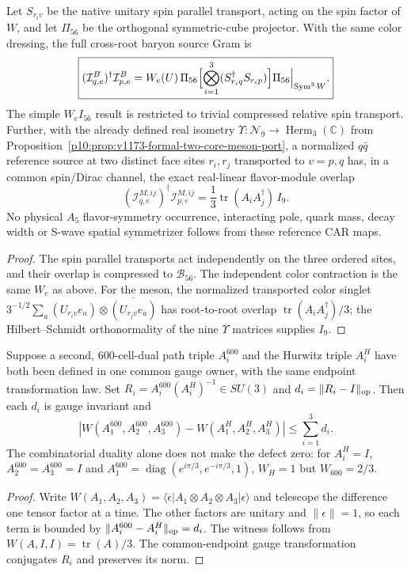 \documentclass[12pt,a4paper]{article}
\begin{document}
\begin{proposition}
\label{p10:prop:v3023-spin-meson-source-overlap}
Let $S_{r_iv}$ be the native unitary spin parallel transport, acting
on the spin factor of $W$, and let $\Pi_{56}$ be the orthogonal
symmetric-cube projector. With the same color dressing, the full
cross-root baryon source Gram is
\[
\boxed{(\mathcal I_{q,e}^B)^\dagger\mathcal I_{p,e}^B
 =W_e(U)\,\Pi_{56}\Bigl[\bigotimes_{i=1}^3
 (S_{r_iq}^\dagger S_{r_ip})\Bigr]\Pi_{56}
 \Big|_{\operatorname{Sym}^3W}.}
\]
The simple $W_eI_{56}$ result is restricted to trivial compressed
relative spin transport. Further, with the already defined real
isometry $\Upsilon:\mathcal N_9\to\operatorname{Herm}_3(\mathbb C)$
from Proposition~\ref{p10:prop:v1173-formal-two-core-meson-port},
a normalized $q\bar q$ reference source at two distinct face sites
$r_i,r_j$ transported to $v=p,q$ has, in a common spin/Dirac
channel, the exact real-linear flavor-module overlap
\[
\boxed{(\mathcal I_{q,e}^{M,ij})^\dagger
 \mathcal I_{p,e}^{M,ij}
 =\frac13\operatorname{tr}(A_iA_j^\dagger)\,I_9.}
\]
No physical $A_5$ flavor-symmetry occurrence, interacting pole,
quark mass, decay width or S-wave spatial symmetrizer follows from
these reference CAR maps.
\end{proposition}
\begin{proof}
The spin parallel transports act independently on the three
ordered sites, and their overlap is compressed to $\mathcal B_{56}$.
The independent color contraction is the same $W_e$ as above.
For the meson, the normalized transported color singlet
$3^{-1/2}\sum_a(U_{r_iv}e_a)\otimes
\overline{(U_{r_jv}e_a)}$ has root-to-root overlap
$\operatorname{tr}(A_iA_j^\dagger)/3$; the Hilbert--Schmidt
orthonormality of the nine $\Upsilon$ matrices supplies $I_9$.
\end{proof}

\begin{proposition}
\label{p10:prop:v3023-two-presentation-holonomy-defect}
Suppose a second, 600-cell-dual path triple $A_i^{600}$ and the
Hurwitz triple $A_i^H$ have both been defined in one common gauge
owner, with the same endpoint transformation law. Set
$R_i=A_i^{600}(A_i^H)^{-1}\in SU(3)$ and
$d_i=\|R_i-I\|_{\rm op}$. Then each $d_i$ is gauge invariant and
\[
\boxed{|W(A_1^{600},A_2^{600},A_3^{600})
 -W(A_1^H,A_2^H,A_3^H)|\le\sum_{i=1}^3d_i.}
\]
The combinatorial duality alone does not make the defect zero:
for $A_i^H=I$, $A_2^{600}=A_3^{600}=I$ and
$A_1^{600}=\operatorname{diag}(e^{i\pi/3},e^{-i\pi/3},1)$,
$W_H=1$ but $W_{600}=2/3$.
\end{proposition}
\begin{proof}
Write $W(A_1,A_2,A_3)=\langle\epsilon|
A_1\otimes A_2\otimes A_3|\epsilon\rangle$ and telescope
the difference one tensor factor at a time. The other factors are
unitary and $\|\epsilon\|=1$, so each term is bounded by
$\|A_i^{600}-A_i^H\|_{\rm op}=d_i$. The witness follows from
$W(A,I,I)=\operatorname{tr}(A)/3$. The common-endpoint gauge
transformation conjugates $R_i$ and preserves its norm.
\end{proof}
\end{document}
